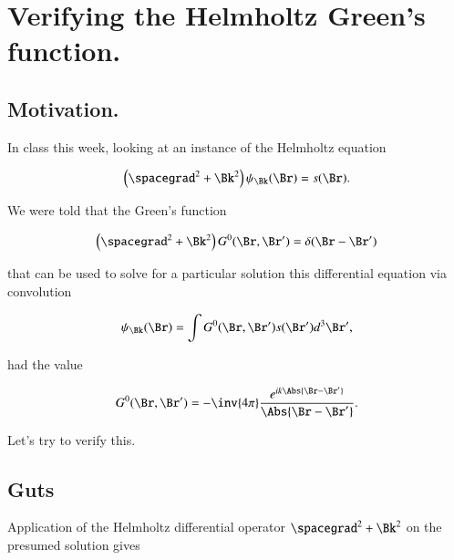 %
%

\chapter{Verifying the Helmholtz Green's function.}
\label{chap:helmholtzGreens}
{}
\date{Dec 12, 2011}

\beginArtWithToc

\section{Motivation.}

In class this week, looking at an instance of the Helmholtz equation

\begin{equation}\label{eqn:helmholtzGreens:10}
\left( \spacegrad^2 + \Bk^2\right) \psi_\Bk(\Br) = s(\Br).
\end{equation}

We were told that the Green's function

\begin{equation}\label{eqn:helmholtzGreens:30}
\left( \spacegrad^2 + \Bk^2\right) G^0(\Br, \Br') = \delta(\Br- \Br')
\end{equation}

that can be used to solve for a particular solution this differential equation via convolution

\begin{equation}\label{eqn:helmholtzGreens:50}
\psi_\Bk(\Br) = \int G^0(\Br, \Br') s(\Br') d^3 \Br',
\end{equation}

had the value

\begin{equation}\label{eqn:helmholtzGreens:70}
G^0(\Br, \Br') = - \inv{4 \pi} \frac{e^{i k \Abs{\Br - \Br'}} }{\Abs{\Br - \Br'}}.
\end{equation}

Let's try to verify this.

\section{Guts}

Application of the Helmholtz differential operator $\spacegrad^2 + \Bk^2$ on the presumed solution gives

